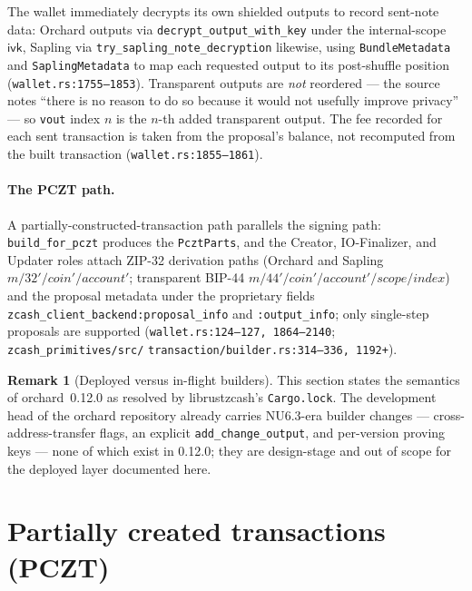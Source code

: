 \documentclass[11pt,a4paper]{article}
\theoremstyle{definition}
\newtheorem{remark}[theorem]{Remark}
\newcommand{\ivk}{\ensuremath{\mathsf{ivk}}}
\begin{document}
The wallet immediately decrypts its own shielded outputs to record sent-note
data: Orchard outputs via \texttt{decrypt\_output\_with\_key} under the
internal-scope $\ivk$, Sapling via \texttt{try\_sapling\_note\_decryption}
likewise, using \texttt{BundleMetadata} and \texttt{SaplingMetadata} to map
each requested output to its post-shuffle position
(\texttt{wallet.rs:1755--1853}). Transparent outputs are \emph{not}
reordered --- the source notes ``there is no reason to do so because it would
not usefully improve privacy'' --- so \texttt{vout} index $n$ is the $n$-th
added transparent output. The fee recorded for each sent transaction is
taken from the proposal's balance, not recomputed from the built transaction
(\texttt{wallet.rs:1855--1861}).

\paragraph{The PCZT path.} A partially-constructed-transaction path
parallels the signing path: \texttt{build\_for\_pczt} produces the
\texttt{PcztParts}, and the Creator, IO-Finalizer, and Updater roles attach
ZIP-32 derivation paths (Orchard and Sapling
$m/32'/\mathit{coin}'/\mathit{account}'$; transparent BIP-44
$m/44'/\mathit{coin}'/\mathit{account}'/\mathit{scope}/\mathit{index}$) and
the proposal metadata under the proprietary fields
\texttt{zcash\_client\_backend:proposal\_info} and
\texttt{:output\_info}; only single-step proposals are supported
(\texttt{wallet.rs:124--127, 1864--2140};
\texttt{zcash\_primitives/src/}\allowbreak%
\texttt{transaction/builder.rs:314--336, 1192+}).

\begin{remark}[Deployed versus in-flight builders]\label{rem:crate-versions}
This section states the semantics of \textsf{orchard}~0.12.0 as resolved by
\textsf{librustzcash}'s \texttt{Cargo.lock}. The development head of the
\textsf{orchard} repository already carries NU6.3-era builder changes ---
cross-address-transfer flags, an explicit \texttt{add\_change\_output}, and
per-version proving keys --- none of which exist in 0.12.0; they are
design-stage and out of scope for the deployed layer documented here.
\end{remark}

\section{Partially created transactions (PCZT)}\label{sec:pczt}
\end{document}
